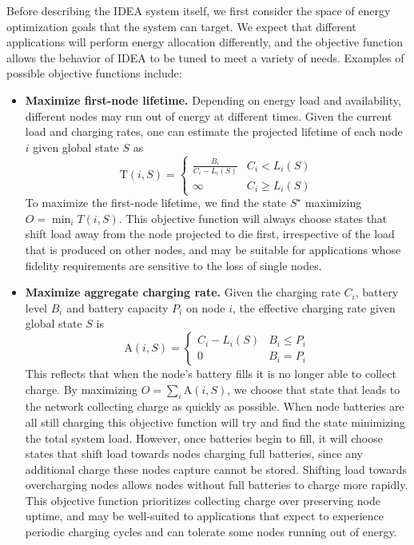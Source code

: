 Before describing the IDEA system itself, we first consider the space
of energy optimization goals that the system can target.
We expect that different applications will perform
energy allocation differently, and the objective function allows
the behavior of IDEA to be tuned to meet a variety of needs. 
Examples of possible objective functions include:
\begin{itemize}
\item \textbf{Maximize first-node lifetime.} Depending on energy load
and availability,
different nodes may run out of energy at different times. Given the
current load and charging rates, one can estimate the projected lifetime of
each node $i$ given global state $S$ as 
\[
\mathrm{T}(i,S) = \left\{ \begin{array}{lr}
\frac{B_i}{C_i - L_i(S)} & C_i < L_i(S) \\ \infty & C_i \ge L_i(S)
\end{array} \right. \] 
To maximize the first-node lifetime, we find the state $S^\star$ 
maximizing $O = \min_{i} T(i,S)$. This objective
function will always choose states that shift load away from the node
projected to die first, irrespective of the load that is produced on other
nodes, and may be suitable for applications whose fidelity requirements are
sensitive to the loss of single nodes.

\item \textbf{Maximize aggregate charging rate.} 
Given the charging rate $C_i$, battery level $B_i$ and battery capacity $P_i$
on node $i$, the effective charging rate given global state $S$ is
\[\mathrm{A}(i,S) = \left\{ \begin{array}{lr} C_i - L_i(S) & B_i \le P_i \\ 0 & B_i = P_i
\end{array} \right. \]
This reflects that when the node's battery fills it is no longer able to
collect charge. By maximizing $O = \sum_{i} \mathrm{A}(i,S)$, we
choose that state that leads to the network collecting charge as quickly as
possible.  When node batteries are all still charging this objective function
will try and find the state minimizing the total system load. However, once
batteries begin to fill, it will choose states that shift load towards nodes
charging full batteries, since any additional charge these nodes capture
cannot be stored. Shifting load towards overcharging nodes allows nodes
without full batteries to charge more rapidly. This objective function
prioritizes collecting charge over preserving node uptime, and may be
well-suited to applications that expect to experience periodic charging
cycles and can tolerate some nodes running out of energy.


\end{itemize}

